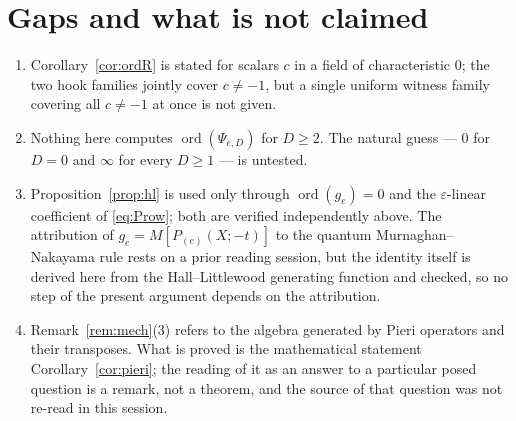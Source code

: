 \documentclass[11pt]{article}
\theoremstyle{plain}
\theoremstyle{definition}
\DeclareMathOperator{\ord}{ord}
\newcommand{\eps}{\varepsilon}
\begin{document}
\section{Gaps and what is not claimed}

\begin{enumerate}
\item Corollary~\ref{cor:ordR} is stated for scalars $c$ in a field of
characteristic $0$; the two hook families jointly cover $c\neq-1$, but a single
uniform witness family covering all $c\neq-1$ at once is not given.
\item Nothing here computes $\ord(\Psi_{e,D})$ for $D\ge2$.  The natural
guess --- $0$ for $D=0$ and $\infty$ for every $D\ge1$ --- is untested.
\item Proposition~\ref{prop:hl} is used only through $\ord(g_e)=0$ and the
$\eps$-linear coefficient of \eqref{eq:Prow}; both are verified independently
above.  The attribution of $g_e=M[P_{(e)}(X;-t)]$ to the quantum
Murnaghan--Nakayama rule rests on a prior reading session, but the identity
itself is derived here from the Hall--Littlewood generating function and
checked, so no step of the present argument depends on the attribution.
\item Remark~\ref{rem:mech}(3) refers to the algebra generated by Pieri
operators and their transposes.  What is proved is the mathematical statement
Corollary~\ref{cor:pieri}; the reading of it as an answer to a particular posed
question is a remark, not a theorem, and the source of that question was not
re-read in this session.
\end{enumerate}
\end{document}
